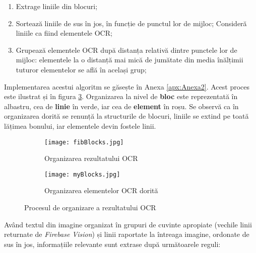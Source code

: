 \begin{enumerate}
  \item
  Extrage liniile din blocuri;
  \item
  Sortează liniile de sus în jos, în funcție de punctul lor de mijloc; Consideră liniile ca fiind elementele OCR;
  \item
  Grupează elementele OCR după distanța relativă dintre punctele lor de mijloc: elementele la o distanță mai mică de jumătate din media înălțimii tuturor elementelor se află în același grup;
\end{enumerate}

Implementarea acestui algoritm se găsește în Anexa \ref{apx:Anexa2}. Acest proces este ilustrat și în figura \ref{fig:ocrProcessing}. Organizarea la nivel de \textbf{bloc} este reprezentată în albastru, cea de \textbf{linie} în verde, iar cea de \textbf{element} în roșu. Se observă ca în organizarea dorită se renunță la structurile de blocuri, liniile se extind pe toată lățimea bonului, iar elementele devin fostele linii.

\begin{figure}[ht]
  \centering
  \begin{subfigure}{0.49\textwidth}
    \centering
    \texttt{[image: fibBlocks.jpg]}
    \caption{Organizarea rezultatului OCR}
    \label{fig:ocrOutputBoxes}
  \end{subfigure}
  \begin{subfigure}{0.49\textwidth}
    \centering
    \texttt{[image: myBlocks.jpg]}
    \caption{Organizarea elementelor OCR dorită}
    \label{fig:desiredBoxes}
  \end{subfigure}
  \caption{Procesul de organizare a rezultatului OCR}
  \label{fig:ocrProcessing}
\end{figure}

Având textul din imagine organizat în grupuri de cuvinte apropiate (vechile linii returnate de \emph{Firebase Vision}) și linii raportate la întreaga imagine, ordonate de sus în jos, informațiile relevante sunt extrase după următoarele reguli:

